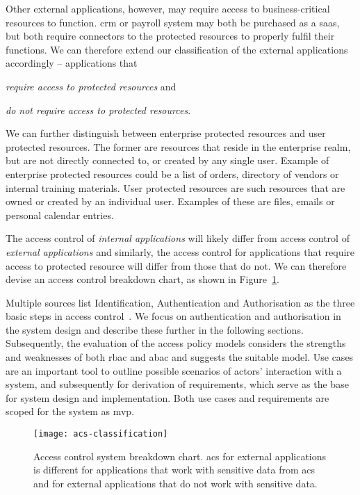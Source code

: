 Other external applications, however, may require access to business-critical resources to function. \acrlong{crm} or payroll system may both be purchased as a \acrshort{saas}, but both require connectors to the protected resources to properly fulfil their functions. We can therefore extend our classification of the external applications accordingly -- applications that
\begin{enumerate*}[label=(\roman*)]
    \item \textit{require access to protected resources} and
    \item \textit{do not require access to protected resources}.
\end{enumerate*}
% 
We can further distinguish between enterprise protected resources and user protected resources. The former are resources that reside in the enterprise realm, but are not directly connected to, or created by any single user. Example of enterprise protected resources could be a list of orders, directory of vendors or internal training materials. User protected resources are such resources that are owned or created by an individual user. Examples of these are files, emails or personal calendar entries.

The access control of \textit{internal applications} will likely differ from access control of \textit{external applications} and similarly, the access control for applications that require access to protected resource will differ from those that do not. We can therefore devise an access control breakdown chart, as shown in Figure~\ref{fig:acs-classification}. 

Multiple sources list Identification, Authentication and Authorisation as the three basic steps in access control~\cite{Harris2008CISSPGuide, 2018AccessSystems, 2003IdentificationAuthorization}. We focus on authentication and authorisation in the system design and describe these further in the following sections. Subsequently, the evaluation of the access policy models considers the strengths and weaknesses of both \acrshort{rbac} and \acrshort{abac} and suggests the suitable model. Use cases are an important tool to outline possible scenarios of actors' interaction with a system, and subsequently for derivation of requirements, which serve as the base for system design and implementation. Both use cases and requirements are scoped for the system as \acrshort{mvp}.

\begin{figure}[ht]
    \centering
    \texttt{[image: acs-classification]}
    \caption{Access control system breakdown chart. \acrshort{acs} for external applications is different for applications that work with sensitive data from \acrshort{acs} and for external applications that do not work with sensitive data.}
    \label{fig:acs-classification}
\end{figure}








\restoregeometry